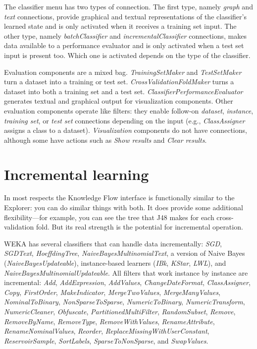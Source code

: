 The classifier menu has two types of connection. The first type,
namely \textit{graph} and \textit{text} connections, provide graphical
and textual representations of the classifier's learned state and is
only activated when it receives a training set input. The other type,
namely \textit{batchClassifier} and \textit{incrementalClassifier}
connections, makes data available to a performance evaluator and is
only activated when a test set input is present too. Which one is
activated depends on the type of the classifier.

Evaluation components are a mixed bag. \textit{TrainingSetMaker} and
\textit{TestSetMaker} turn a dataset into a training or test
set. \textit{CrossValidationFoldMaker} turns a dataset into both a
training set and a test set. \textit{ClassifierPerformanceEvaluator}
generates textual and graphical output for visualization
components. Other evaluation components operate like filters: they
enable follow-on \textit{dataset}, \textit{instance}, \textit{training
set}, or \textit{test set} connections depending on the input (e.g.,
\textit{ClassAssigner} assigns a class to a dataset). \textit{Visualization} components
do not have connections, although some have actions such
as \textit{Show results} and \textit{Clear results}.

\section{Incremental learning}

In most respects the Knowledge Flow interface is functionally similar
to the Explorer: you can do similar things with both. It does provide
some additional flexibility—for example, you can see the tree that J48
makes for each cross-validation fold. But its real strength is the
potential for incremental operation.

WEKA has several classifiers that can handle data incrementally: \textit{SGD},
\textit{SGDText}, \textit{HoeffdingTree}, \textit{NaiveBayesMultinomialText}, a version of Naive
Bayes (\textit{NaiveBayesUpdateable}), instance-based learners (\textit{IBk}, \textit{KStar},
\textit{LWL}), and \textit{NaiveBayesMultinomialUpdateable}. All filters that work
instance by instance are
incremental: \textit{Add}, \textit{AddExpression}, \textit{AddValues},
\textit{ChangeDateFormat}, \textit{ClassAssigner}, \textit{Copy}, \textit{FirstOrder}, \textit{MakeIndicator},
\textit{MergeTwoValues}, \textit{MergeManyValues}, \textit{NominalToBinary}, \textit{NonSparseToSparse},
\textit{NumericToBinary}, \textit{NumericTransform}, \textit{NumericCleaner}, \textit{Obfuscate},
\textit{PartitionedMultiFilter}, \textit{RandomSubset}, \textit{Remove}, \textit{RemoveByName},
\textit{RemoveType}, \textit{RemoveWithValues}, \textit{RenameAttribute}, \textit{RenameNominalValues},
\textit{Reorder}, \textit{ReplaceMissingWithUserConstant}, \textit{ReservoirSample}, \textit{SortLabels},
\textit{SparseToNonSparse}, and \textit{SwapValues}.


